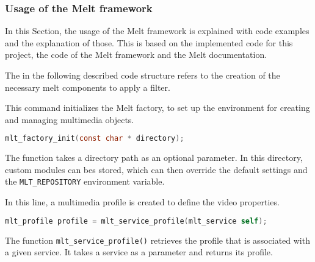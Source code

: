 \documentclass[../MasterThesis.tex]{subfiles}
\begin{document}
\subsubsection*{Usage of the Melt framework}


In this Section, the usage of the Melt framework is explained with code examples and the explanation of those. This is based on the implemented code for this project, the code of the Melt framework and the Melt documentation.~\cite{melt}

The in the following described code structure refers to the creation of the necessary melt components to apply a filter.


\begin{description}[font=\normalfont\color{RedViolet!80!black}, style=nextline]
	
	\item[Initialise the factory] 
	
	This command initializes the Melt factory, to set up the environment for creating and managing multimedia objects.
	
	\begin{lstlisting}[language=C, numbers=none, basicstyle=\scriptsize\ttfamily, belowskip=0pt, aboveskip=9pt]
	mlt_factory_init(const char * directory); \end{lstlisting}

	The function takes a directory path as an optional parameter. In this directory, custom modules can bes stored, which can then override the default settings and the \texttt{MLT\_REPOSITORY} environment variable. 
	
	
	\item[Create a profile]
	
	In this line, a multimedia profile is created to define the video properties.
	
	\begin{lstlisting}[language=C, numbers=none, basicstyle=\scriptsize\ttfamily, belowskip=0pt, aboveskip=9pt]
		mlt_profile profile = mlt_service_profile(mlt_service self); \end{lstlisting}
	
	The function \texttt{mlt\_service\_profile()} retrieves the profile that is associated with a given service. It takes a service as a parameter and returns its profile.
	
	


	\item[Create a producer] 


\end{description}
\end{document}
